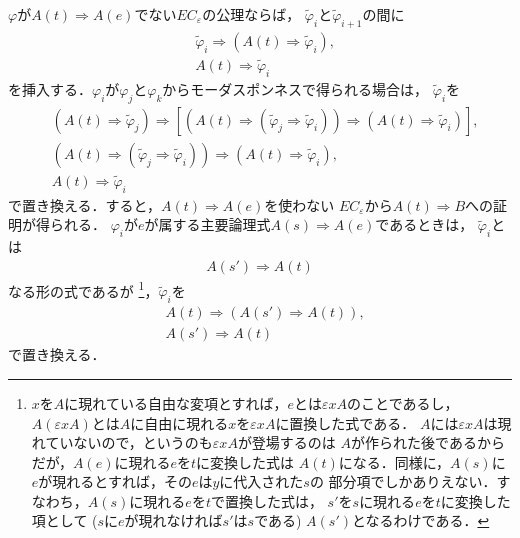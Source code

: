 	$\varphi$が$A(t) \Longrightarrow A(e)$でない$EC_{\varepsilon}$の公理ならば，
	$\tilde{\varphi}_{i}$と$\tilde{\varphi}_{i+1}$の間に
	\begin{align}
		&\tilde{\varphi}_{i} \Longrightarrow 
		\left( A(t) \Longrightarrow \tilde{\varphi}_{i} \right), \\
		&A(t) \Longrightarrow \tilde{\varphi}_{i}
	\end{align}
	を挿入する．$\varphi_{i}$が$\varphi_{j}$と$\varphi_{k}$からモーダスポンネスで得られる場合は，
	$\tilde{\varphi}_{i}$を
	\begin{align}
		&\left( A(t) \Longrightarrow \tilde{\varphi}_{j} \right)
		\Longrightarrow \left[ \left( A(t) \Longrightarrow 
		\left( \tilde{\varphi}_{j}\Longrightarrow \tilde{\varphi}_{i} \right) \right)
		\Longrightarrow \left( A(t) \Longrightarrow \tilde{\varphi}_{i} \right) \right], \\
		&\left( A(t) \Longrightarrow 
		\left( \tilde{\varphi}_{j}\Longrightarrow \tilde{\varphi}_{i} \right) \right)
		\Longrightarrow \left( A(t) \Longrightarrow \tilde{\varphi}_{i} \right), \\
		&A(t) \Longrightarrow \tilde{\varphi}_{i}
	\end{align}
	で置き換える．すると，$A(t) \Longrightarrow A(e)$を使わない
	$EC_{\varepsilon}$から$A(t) \Longrightarrow B$への証明が得られる．
	$\varphi_{i}$が$e$が属する主要論理式$A(s) \Longrightarrow A(e)$であるときは，
	$\tilde{\varphi}_{i}$とは
	\begin{align}
		A(s') \Longrightarrow A(t)
	\end{align}
	なる形の式であるが
	\footnote{
		$x$を$A$に現れている自由な変項とすれば，$e$とは$\varepsilon x A$のことであるし，
		$A(\varepsilon x A)$とは$A$に自由に現れる$x$を$\varepsilon x A$に置換した式である．
		$A$には$\varepsilon x A$は現れていないので，というのも$\varepsilon x A$が登場するのは
		$A$が作られた後であるからだが，$A(e)$に現れる$e$を$t$に変換した式は
		$A(t)$になる．同様に，$A(s)$に$e$が現れるとすれば，その$e$は$y$に代入された$s$の
		部分項でしかありえない．すなわち，$A(s)$に現れる$e$を$t$で置換した式は，
		$s'$を$s$に現れる$e$を$t$に変換した項として ($s$に$e$が現れなければ$s'$は$s$である)
		$A(s')$となるわけである．
	}，$\tilde{\varphi}_{i}$を
	\begin{align}
		&A(t) \Longrightarrow (A(s') \Longrightarrow A(t)), \\
		&A(s') \Longrightarrow A(t)
	\end{align}
	で置き換える．
	
